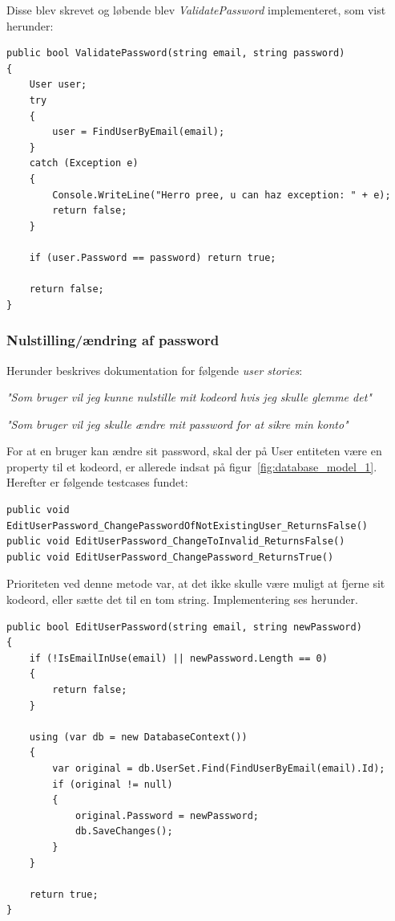 Disse blev skrevet og løbende blev \textit{ValidatePassword} implementeret, som vist herunder:

\begin{lstlisting}[caption=ValidatePassword metoden]
public bool ValidatePassword(string email, string password)
{
	User user;
	try
	{
		user = FindUserByEmail(email);
	}
	catch (Exception e)
	{
		Console.WriteLine("Herro pree, u can haz exception: " + e);
		return false;
	}
	
	if (user.Password == password) return true;
	
	return false;
}
\end{lstlisting}

\subsubsection{Nulstilling/ændring af password}
Herunder beskrives dokumentation for følgende \textit{user stories}:

\textit{"Som bruger vil jeg kunne nulstille mit kodeord hvis jeg skulle glemme det"}

\textit{"Som bruger vil jeg skulle ændre mit password for at sikre min konto"}

For at en bruger kan ændre sit password, skal der på User entiteten være en property til et kodeord, er allerede indsat på figur~\ref{fig:database_model_1}. Herefter er følgende testcases fundet: 

\begin{lstlisting}[caption=Testcases til EditUserPassword metoden]
public void EditUserPassword_ChangePasswordOfNotExistingUser_ReturnsFalse()
public void EditUserPassword_ChangeToInvalid_ReturnsFalse()
public void EditUserPassword_ChangePassword_ReturnsTrue()
\end{lstlisting}

Prioriteten ved denne metode var, at det ikke skulle være muligt at fjerne sit kodeord, eller sætte det til en tom string. Implementering ses herunder.

\begin{lstlisting}[caption=EditUserPassword metoden]
public bool EditUserPassword(string email, string newPassword)
{
	if (!IsEmailInUse(email) || newPassword.Length == 0)
	{
		return false;
	}
	
	using (var db = new DatabaseContext())
	{
		var original = db.UserSet.Find(FindUserByEmail(email).Id);
		if (original != null)
		{
			original.Password = newPassword;
			db.SaveChanges();
		}
	}
	
	return true;
}
\end{lstlisting}


